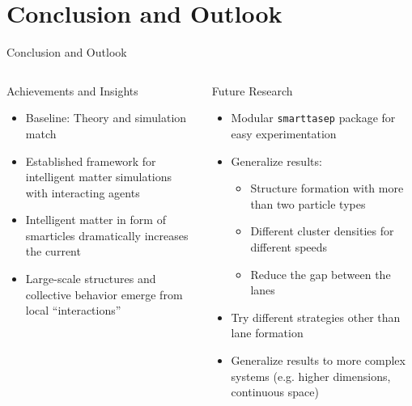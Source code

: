 \documentclass[10pt,xcolor=table, aspectratio=1610]{beamer}
\begin{document}
\section{Conclusion and Outlook}
\begin{frame}{Conclusion and Outlook}
  \begin{columns}
    \begin{block}{Achievements and Insights}
      \begin{itemize}
        \item Baseline: Theory and simulation match
        \item Established framework for intelligent matter simulations with interacting agents
        \item Intelligent matter in form of smarticles dramatically increases the current
        \item Large-scale structures and collective behavior emerge from local \enquote{interactions}
      \end{itemize}
    \end{block}
    \begin{block}{Future Research}
      \begin{itemize}
        \item Modular \texttt{smarttasep} package for easy experimentation
        \item Generalize results:
        \begin{itemize}
          \item Structure formation with more than two particle types
          \item Different cluster densities for different speeds
          \item Reduce the gap between the lanes
        \end{itemize}
        \item Try different strategies other than lane formation
        \item Generalize results to more complex systems (e.g. higher dimensions, continuous space)
      \end{itemize}
    \end{block}
  \end{columns}
\end{frame}
\end{document}
